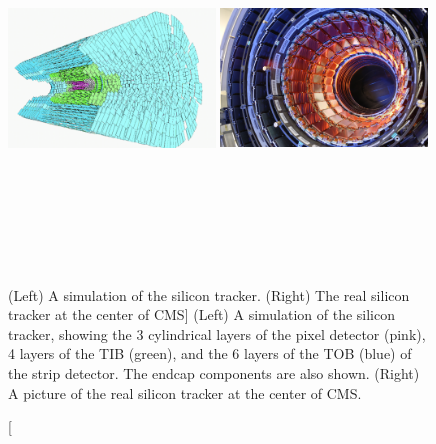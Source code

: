 \begin{figure}[pbth]
\centering
\includegraphics[width=0.49\textwidth,height=10cm,keepaspectratio]{figures/cms/tracker/silicon_tracker_simulated.png}
\includegraphics[width=0.49\textwidth,height=10cm,keepaspectratio]{figures/cms/tracker/silicon_tracker_real.jpg}
    \caption
        [(Left) A simulation of the silicon tracker. (Right) The real silicon tracker at the center of CMS]
        {
        (Left) A simulation of the silicon tracker, showing the 3 cylindrical layers of the pixel detector (pink), 4 layers of the TIB (green), and the 6 layers of the TOB (blue) of the strip detector.
        The endcap components are also shown.
        (Right) A picture of the real silicon tracker at the center of CMS.
        } 
    \label{fig:tracker_real}
\end{figure}
